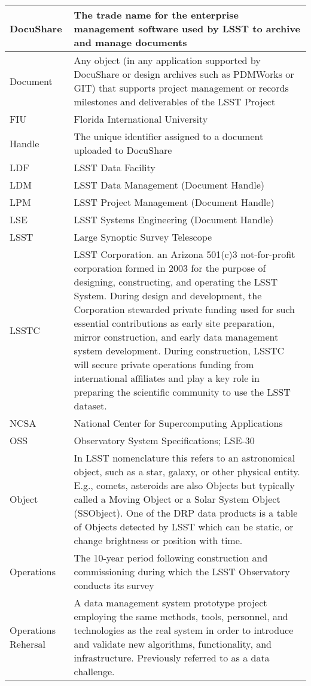 \begin{longtable}{|l|p{}|}
DocuShare & The trade name for the enterprise management software used by LSST to archive and manage documents \\\hline
Document & Any object (in any application supported by DocuShare or design archives such as PDMWorks or GIT) that supports project management or records milestones and deliverables of the LSST Project \\\hline
FIU & Florida International University \\\hline
Handle & The unique identifier assigned to a document uploaded to DocuShare \\\hline
LDF & LSST Data Facility \\\hline
LDM & LSST Data Management (Document Handle) \\\hline
LPM & LSST Project Management (Document Handle) \\\hline
LSE & LSST Systems Engineering (Document Handle) \\\hline
LSST & Large Synoptic Survey Telescope \\\hline
LSSTC & \gls{LSST} Corporation. an Arizona 501(c)3 not-for-profit corporation formed in 2003 for the purpose of designing, constructing, and operating the LSST System. During design and development, the Corporation stewarded private funding used for such essential contributions as early site preparation, mirror construction, and early data management system development. During construction, LSSTC will secure private operations funding from international affiliates and play a key role in preparing the scientific community to use the LSST dataset. \\\hline
NCSA & National Center for Supercomputing Applications \\\hline
OSS & Observatory System Specifications; LSE-30 \\\hline
Object & In LSST nomenclature this refers to an astronomical object, such as a star, galaxy, or other physical entity. E.g., comets, asteroids are also Objects but typically called a Moving Object or a Solar System Object (SSObject). One of the DRP data products is a table of Objects detected by LSST which can be static, or change brightness or position with time. \\\hline
Operations & The 10-year period following construction and commissioning during which the LSST Observatory conducts its survey \\\hline
Operations Rehersal & A data management system prototype project employing the same methods, tools, personnel, and technologies as the real system in order to introduce and validate new algorithms, functionality, and infrastructure. Previously referred to as a data challenge. \\\hline

\end{longtable}
